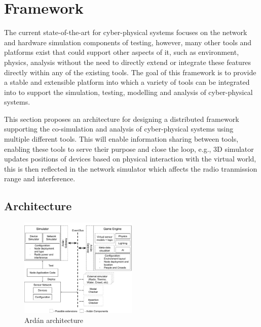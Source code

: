 


\section{Framework}
\label{sec:framework}
The current state-of-the-art for cyber-physical systems focuses on the network and hardware simulation components of testing, however, many other tools and platforms exist that could support other aspects of it, such as environment, physics, analysis without the need to directly extend or integrate these features directly within any of the existing tools. 
The goal of this framework is to provide a stable and extensible platform into which a variety of tools can be integrated into to support the simulation, testing, modelling and analysis of cyber-physical systems.

This section proposes an architecture for designing a distributed framework supporting the co-simulation and analysis of cyber-physical systems using multiple different tools.
This will enable information sharing between tools, enabling these tools to serve their purpose and close the loop, e.g., 3D simulator updates positions of devices based on physical interaction with the virtual world, this is then reflected in the network simulator which affects the radio tranmission range and interference.



\subsection{Architecture} %
\label{sub:architecture}

\begin{figure}[ht]
\centering
  \includegraphics[width=0.5\textwidth]{./imgs/architecture}
  \caption{Ard\'{a}n architecture}
  \label{fig:architecture}
\end{figure}


